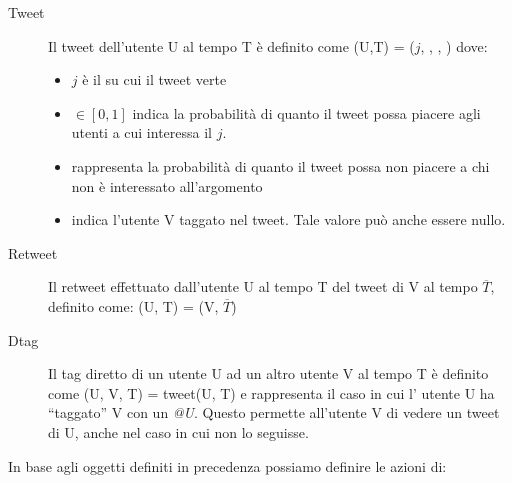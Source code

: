 \begin{description}
  \item[Tweet] Il tweet dell'utente U al tempo T \`e definito come
  \twt{}(U,T) = ($j$, \lika{}, \disla{}, \dtag
  ) dove:
  \begin{itemize}
    \item $j$ \`e il \topic{} su cui il tweet verte
    \item \lika{} $\in [0,1]$ indica la probabilit\`a di quanto
    il tweet possa piacere agli utenti a cui interessa il 
    \topic{} $j$. 
    \item \disla{} rappresenta la probabilit\`a di quanto il tweet 
    possa non piacere a chi non \`e interessato all'argomento
    \item \dtag{} indica l'utente V taggato nel tweet. Tale valore 
    pu\`o anche essere nullo.
  \end{itemize}
  
  \item[Retweet] Il retweet effettuato dall'utente U al tempo T
  del tweet di V al tempo $\overline{T}$, definito come:
  \retwt{}(U, T) = \twt{}(V, $\overline{T}$)
  
  \item[Dtag] Il tag diretto di un utente U ad un altro utente V al 
  tempo T \`e definito come \dtag{}(U, V, T) = tweet(U, T) e 
  rappresenta il caso in cui l' utente U ha ``taggato'' V con un 
  \textit{@U}. Questo permette all'utente V di vedere un tweet 
  di U, anche nel caso in cui non lo seguisse.
\end{description}

In base agli oggetti definiti in precedenza possiamo definire le 
azioni di:

